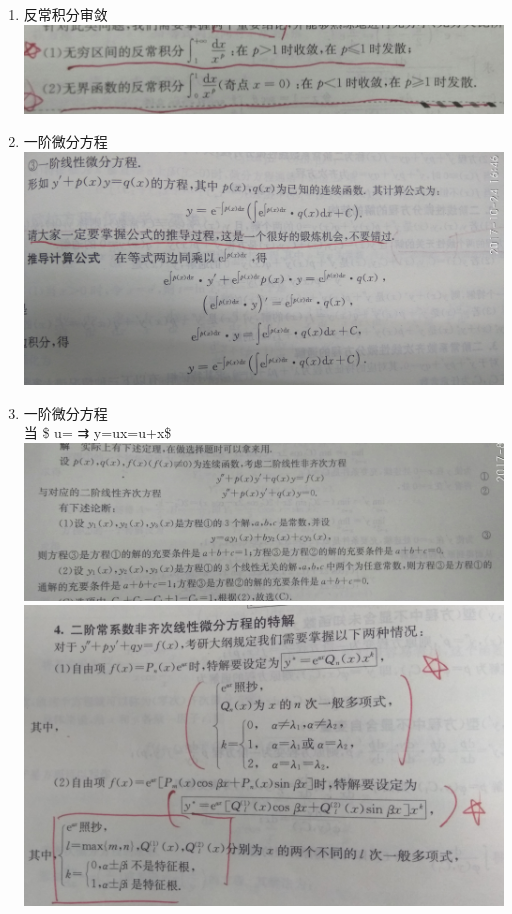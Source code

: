 \documentclass[11pt]{article}
\makeatletter
\def\maxwidth{\ifdim\Gin@nat@width>\linewidth\linewidth
    \else\Gin@nat@width\fi}
\let\Oldincludegraphics\includegraphics
\renewcommand{\includegraphics}[1]{\Oldincludegraphics[width=.8\maxwidth]{#1}}
\makeatother
\begin{document}
\begin{enumerate}
\item
  反常积分审敛\\
  \includegraphics{9345E7/2059466188.jpg}
\item
  一阶微分方程 \includegraphics{9345E7/677562795.jpg}\\
\item
  一阶微分方程\\
  当 \$ u= ⇉ y=ux=u+x\$\\
  \includegraphics{9345E7/478763472.jpg}\\
  \includegraphics{9345E7/595734581.jpg}\\

\end{enumerate}
\end{document}
